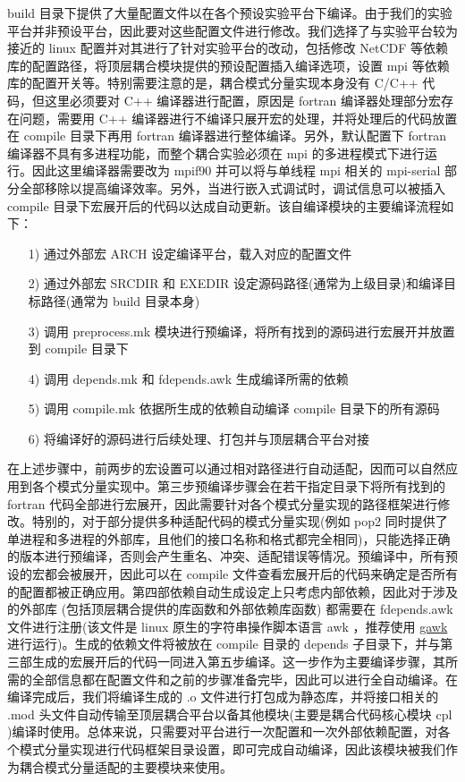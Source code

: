 build 目录下提供了大量配置文件以在各个预设实验平台下编译。由于我们的实验平台并非预设平台，因此要对这些配置文件进行修改。我们选择了与实验平台较为接近的 linux 配置并对其进行了针对实验平台的改动，包括修改 NetCDF 等依赖库的配置路径，将顶层耦合模块提供的预设配置插入编译选项，设置 mpi 等依赖库的配置开关等。特别需要注意的是，耦合模式分量实现本身没有 C/C++ 代码，但这里必须要对 C++ 编译器进行配置，原因是 fortran 编译器处理部分宏存在问题，需要用 C++ 编译器进行不编译只展开宏的处理，并将处理后的代码放置在 compile 目录下再用 fortran 编译器进行整体编译。另外，默认配置下 fortran 编译器不具有多进程功能，而整个耦合实验必须在 mpi 的多进程模式下进行运行。因此这里编译器需要改为 mpif90 并可以将与单线程 mpi 相关的 mpi-serial 部分全部移除以提高编译效率。另外，当进行嵌入式调试时，调试信息可以被插入 compile 目录下宏展开后的代码以达成自动更新。该自编译模块的主要编译流程如下：

\begin{itemize}
  \item [1)] 
通过外部宏 ARCH 设定编译平台，载入对应的配置文件
  \item [2)]
通过外部宏 SRCDIR 和 EXEDIR 设定源码路径(通常为上级目录)和编译目标路径(通常为 build 目录本身)
  \item [3)]
调用 preprocess.mk 模块进行预编译，将所有找到的源码进行宏展开并放置到 compile 目录下
  \item [4)]
调用 depends.mk 和 fdepends.awk 生成编译所需的依赖
  \item [5)]
调用 compile.mk 依据所生成的依赖自动编译 compile 目录下的所有源码
  \item [6)]
将编译好的源码进行后续处理、打包并与顶层耦合平台对接
\end{itemize}

在上述步骤中，前两步的宏设置可以通过相对路径进行自动适配，因而可以自然应用到各个模式分量实现中。第三步预编译步骤会在若干指定目录下将所有找到的 fortran 代码全部进行宏展开，因此需要针对各个模式分量实现的路径框架进行修改。特别的，对于部分提供多种适配代码的模式分量实现(例如 pop2 同时提供了单进程和多进程的外部库，且他们的接口名称和格式都完全相同)，只能选择正确的版本进行预编译，否则会产生重名、冲突、适配错误等情况。预编译中，所有预设的宏都会被展开，因此可以在 compile 文件查看宏展开后的代码来确定是否所有的配置都被正确应用。第四部依赖自动生成设定上只考虑内部依赖，因此对于涉及的外部库 (包括顶层耦合提供的库函数和外部依赖库函数) 都需要在 fdepends.awk 文件进行注册(该文件是 linux 原生的字符串操作脚本语言 awk ，推荐使用 \href{https://www.gnu.org/software/gawk/manual/gawk.html#Getting-Started}{gawk} 进行运行)。生成的依赖文件将被放在 compile 目录的 depends 子目录下，并与第三部生成的宏展开后的代码一同进入第五步编译。这一步作为主要编译步骤，其所需的全部信息都在配置文件和之前的步骤准备完毕，因此可以进行全自动编译。在编译完成后，我们将编译生成的 .o 文件进行打包成为静态库，并将接口相关的 .mod 头文件自动传输至顶层耦合平台以备其他模块(主要是耦合代码核心模块 cpl )编译时使用。总体来说，只需要对平台进行一次配置和一次外部依赖配置，对各个模式分量实现进行代码框架目录设置，即可完成自动编译，因此该模块被我们作为耦合模式分量适配的主要模块来使用。

